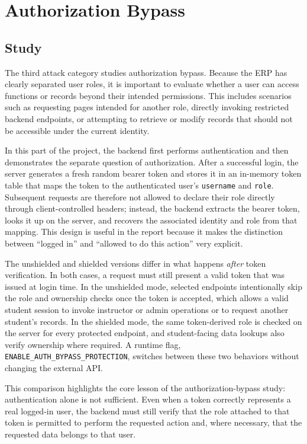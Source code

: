\documentclass[11pt,a4paper]{article}
\begin{document}
\section{Authorization Bypass}

\subsection{Study}

The third attack category studies authorization bypass. Because the ERP has clearly separated user roles, it is important to evaluate whether a user can access functions or records beyond their intended permissions. This includes scenarios such as requesting pages intended for another role, directly invoking restricted backend endpoints, or attempting to retrieve or modify records that should not be accessible under the current identity.

In this part of the project, the backend first performs authentication and then demonstrates the separate question of authorization. After a successful login, the server generates a fresh random bearer token and stores it in an in-memory token table that maps the token to the authenticated user's \texttt{username} and \texttt{role}. Subsequent requests are therefore not allowed to declare their role directly through client-controlled headers; instead, the backend extracts the bearer token, looks it up on the server, and recovers the associated identity and role from that mapping. This design is useful in the report because it makes the distinction between ``logged in'' and ``allowed to do this action'' very explicit.

The unshielded and shielded versions differ in what happens \emph{after} token verification. In both cases, a request must still present a valid token that was issued at login time. In the unshielded mode, selected endpoints intentionally skip the role and ownership checks once the token is accepted, which allows a valid student session to invoke instructor or admin operations or to request another student's records. In the shielded mode, the same token-derived role is checked on the server for every protected endpoint, and student-facing data lookups also verify ownership where required. A runtime flag, \texttt{ENABLE\_AUTH\_BYPASS\_PROTECTION}, switches between these two behaviors without changing the external API.

This comparison highlights the core lesson of the authorization-bypass study: authentication alone is not sufficient. Even when a token correctly represents a real logged-in user, the backend must still verify that the role attached to that token is permitted to perform the requested action and, where necessary, that the requested data belongs to that user.
\end{document}
